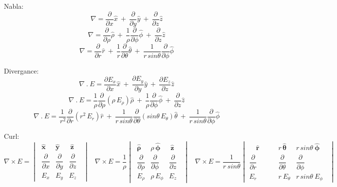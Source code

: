 \par
Nabla:
$$ \nabla = \frac{\partial}{\partial x} \hat{x} ~+~ \frac{\partial}{\partial y} \hat{y} ~+~ \frac{\partial}{\partial z} \hat{z} $$
$$ \nabla = \frac{\partial}{\partial \rho} \hat{\rho} ~+~ \frac{1}{\rho}\frac{\partial}{\partial \phi} \hat{\phi} ~+~ \frac{\partial}{\partial z} \hat{z} $$
$$ \nabla = \frac{\partial}{\partial r} \hat{r} ~+~ \frac{1}{r}\frac{\partial}{\partial \theta} \hat{\theta} ~+~ \frac{1}{r\,sin\theta}\frac{\partial}{\partial \phi} \hat{\phi} $$
\par
Divergance:
$$ \nabla~.~E = \frac{\partial E_x}{\partial x} \hat{x} ~+~ \frac{\partial E_y}{\partial y} \hat{y} ~+~ \frac{\partial E_z}{\partial z} \hat{z} $$
$$ \nabla~.~E = \frac{1}{\rho} \frac{\partial}{\partial \rho} (\rho \,E_{\rho}) \hat{\rho} ~+~ \frac{1}{\rho}\frac{\partial}{\partial \phi} \hat{\phi} ~+~ \frac{\partial}{\partial z} \hat{z} $$
$$ \nabla~.~E = \frac {1}{\,r^2}\frac{\partial}{\partial r} (r^2 \, E_r) \hat{r} ~+~ \frac{1}{r\,sin\theta}\frac{\partial}{\partial \theta}(sin\theta\, E_{\theta}) \hat{\theta} ~+~ \frac{1}{r\,sin\theta}\frac{\partial}{\partial \phi} \hat{\phi} $$
\par
Curl:
$$ \nabla \times E =  \begin{vmatrix}
\;\hat{\boldsymbol{x}} & \hat{\boldsymbol{y}} & ~\hat{\boldsymbol{z}}\;\;\\[0.25em]
\;\dfrac{\partial}{\partial x} & \dfrac{\partial}{\partial y} & \dfrac{\partial}{\partial z}\;\;\\[0.8em]
\;E_x & E_y & E_z\;\;
\end{vmatrix} ~~~~
 \nabla \times E = \frac{1}{\rho} \begin{vmatrix}
\;\hat{\boldsymbol{\rho}} & \rho\,\hat{\boldsymbol{\phi}} & ~\hat{\boldsymbol{z}}\;\;\\[0.25em]
\;\dfrac{\partial}{\partial \rho} & \dfrac{\partial}{\partial \phi} & \dfrac{\partial}{\partial z}\;\;\\[0.8em]
\;E_{\rho} & \rho\,E_{\phi} & E_z\;\;
\end{vmatrix} ~~~~
 \nabla \times E = \frac{1}{r~ sin \theta} \begin{vmatrix}
\quad\hat{\boldsymbol{r}}\quad\quad & r \, \hat{\boldsymbol{\theta}} & r\, sin \theta \:\hat{\boldsymbol{\phi}}\;\;\\[0.25em]
\dfrac{\partial}{\partial r} & \dfrac{\partial}{\partial \theta} & \dfrac{\partial}{\partial \phi}\;\;\\[0.8em]
E_{r} & r\: E_{\theta} & r\, sin \theta \: E_{\phi}\;\;
\end{vmatrix}$$
\par
\begin{minipage}[b]{.49\textwidth}
\lipsum[1-2]
\end{minipage}%
\hspace{.02\textwidth}
\begin{minipage}[b]{.49\textwidth}
\lipsum[1-2]
\end{minipage}%
\par
\setlength{\parindent}{0.0cm} %
